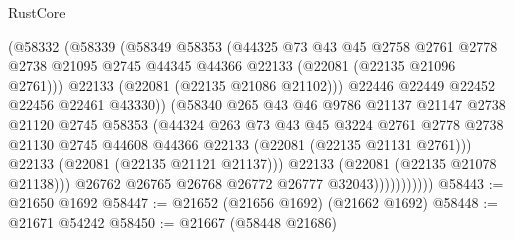 \begin{lexlean}{RustCore}
\begin{coremodule}
                            (@58332
                              (@58339
                                (@58349
                                  @58353
                                  (@44325
                                    @73
                                    @43
                                    @45
                                    @2758
                                    @2761
                                    @2778
                                    @2738
                                    @21095
                                    @2745
                                    @44345
                                    @44366
                                    @22133
                                    (@22081 (@22135 @21096 @2761)))
                                  @22133
                                  (@22081 (@22135 @21086 @21102)))
                                @22446
                                @22449
                                @22452
                                @22456
                                @22461
                                @43330))
                            (@58340
                              @265
                              @43
                              @46
                              @9786
                              @21137
                              @21147
                              @2738
                              @21120
                              @2745
                              @58353
                              (@44324
                                @263
                                @73
                                @43
                                @45
                                @3224
                                @2761
                                @2778
                                @2738
                                @21130
                                @2745
                                @44608
                                @44366
                                @22133
                                (@22081 (@22135 @21131 @2761)))
                              @22133
                              (@22081 (@22135 @21121 @21137)))
                            @22133
                            (@22081 (@22135 @21078 @21138)))
                          @26762
                          @26765
                          @26768
                          @26772
                          @26777
                          @32043)))))))))))
@58443 := @21650 @1692
@58447 := @21652 (@21656 @1692) (@21662 @1692)
@58448 := @21671 @54242
@58450 := @21667 (@58448 @21686)

\end{coremodule}
\end{lexlean}
